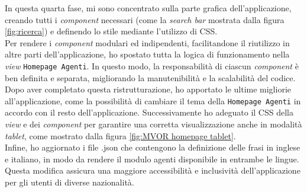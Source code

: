 In questa quarta fase, mi sono concentrato sulla parte grafica dell'applicazione, creando tutti i \textit{component} 
necessari (come la \textit{search bar} mostrata dalla figura \ref{fig:ricerca}) e definendo lo stile mediante l'utilizzo di CSS.\\
Per rendere i \textit{component} modulari ed indipendenti, facilitandone il riutilizzo in altre parti dell'applicazione, ho 
spostato tutta la logica di funzionamento nella \textit{view} \texttt{Homepage Agenti}. In questo modo, la 
responsabilità di ciascun \textit{component} è ben definita e separata, migliorando la manutenibilità e la scalabilità del codice.\\
Dopo aver completato questa ristrutturazione, ho apportato le ultime migliorie all'applicazione, come la possibilità di cambiare 
il tema della \texttt{Homepage Agenti} in accordo con il resto dell'applicazione. Successivamente ho adeguato il CSS 
della \textit{view} e dei \textit{component} per garantire una corretta visualizzazione anche in modalità \textit{tablet}, come 
mostrato dalla figura \ref{fig:MVOR homepage tablet}.\\
Infine, ho aggiornato i file .json che contengono la definizione delle frasi in inglese e italiano, in modo da rendere il modulo 
agenti disponibile in entrambe le lingue. Questa modifica assicura una maggiore accessibilità e inclusività dell'applicazione 
per gli utenti di diverse nazionalità.